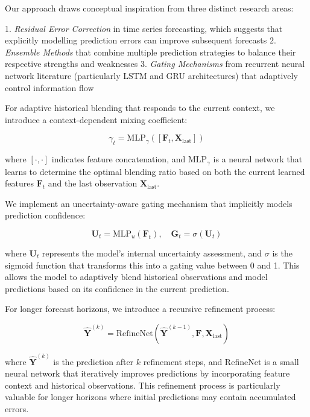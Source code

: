 \documentclass[lettersize, journal]{IEEEtran}
\begin{document}
Our approach draws conceptual inspiration from three distinct research areas:

1. \textit{Residual Error Correction} in time series forecasting, which suggests that explicitly modelling prediction errors can improve subsequent forecasts
2. \textit{Ensemble Methods} that combine multiple prediction strategies to balance their respective strengths and weaknesses
3. \textit{Gating Mechanisms} from recurrent neural network literature (particularly LSTM and GRU architectures) that adaptively control information flow

For adaptive historical blending that responds to the current context, we introduce a context-dependent mixing coefficient:

\begin{equation}
\gamma_t = \text{MLP}_{\gamma}([\mathbf{F}_t, \mathbf{X}_{\text{last}}])
\end{equation}

where $[\cdot,\cdot]$ indicates feature concatenation, and $\text{MLP}_{\gamma}$ is a neural network that learns to determine the optimal blending ratio based on both the current learned features $\mathbf{F}_t$ and the last observation $\mathbf{X}_{\text{last}}$.

We implement an uncertainty-aware gating mechanism that implicitly models prediction confidence:

\begin{equation}
\mathbf{U}_t = \text{MLP}_u(\mathbf{F}_t), \quad \mathbf{G}_t = \sigma(\mathbf{U}_t)
\end{equation}

where $\mathbf{U}_t$ represents the model's internal uncertainty assessment, and $\sigma$ is the sigmoid function that transforms this into a gating value between 0 and 1. This allows the model to adaptively blend historical observations and model predictions based on its confidence in the current prediction.

For longer forecast horizons, we introduce a recursive refinement process:

\begin{equation}
\hat{\mathbf{Y}}^{(k)} = \text{RefineNet}(\hat{\mathbf{Y}}^{(k-1)}, \mathbf{F}, \mathbf{X}_{\text{last}})
\end{equation}

where $\hat{\mathbf{Y}}^{(k)}$ is the prediction after $k$ refinement steps, and RefineNet is a small neural network that iteratively improves predictions by incorporating feature context and historical observations. This refinement process is particularly valuable for longer horizons where initial predictions may contain accumulated errors.
\end{document}
